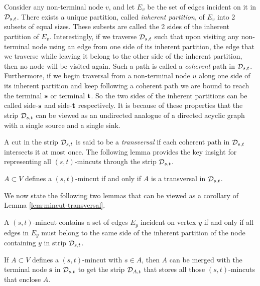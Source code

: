  Consider any non-terminal node $v$, and let $E_v$ be the set of edges incident on it in ${\cal D}_{s,t}$. There exists a unique partition, called {\em inherent partition}, of $E_v$ into 2 subsets of equal sizes. These subsets are called the 2 sides of the inherent partition of $E_v$. 
 Interestingly, if we traverse ${\cal D}_{s,t}$ such that upon visiting any non-terminal node using an edge from one side of its inherent partition, the edge that we traverse while leaving it belong to the other side of the inherent partition, then no node will be visited again. Such a path is called a {\em coherent} path in ${\cal D}_{s,t}$. Furthermore, if we begin traversal from a non-terminal node $u$ along one side of its inherent partition and keep following a coherent path we are bound to reach the terminal ${\bf s}$ or terminal ${\bf t}$. So the two sides of the inherent partitions can be called side-${\bf s}$
 and side-${\bf t}$ respectively.
It is because of these properties
that the strip ${\cal D}_{s,t}$ can be viewed as an undirected analogue of a directed acyclic graph with a single source and a single sink. 

A cut in the strip ${\cal D}_{s,t}$ is said to be a \textit{transversal} if each coherent path in ${\cal D}_{s,t}$ intersects it at most once. The following lemma provides the key insight for representing all $(s,t)$-mincuts through the strip ${\cal D}_{s,t}$.
\begin{lemma}
    $A\subset V$ defines a $(s,t)$-mincut if and only if $A$ is a transversal in ${\cal D}_{s,t}$.
    \label{lem:mincut-transversal}
\end{lemma}

We now state the following two lemmas that can be viewed as a corollary of Lemma \ref{lem:mincut-transversal}.

\begin{lemma}
A $(s,t)$-mincut contains a set of edges $E_y$ incident on vertex $y$ if and only if all edges in $E_y$ must belong to the same side of the inherent partition of the node containing $y$ in strip ${\cal D}_{s,t}$.
\label{lem:E_y-edges-same-side}
\end{lemma}

\begin{lemma} 
If $A\subset V$ defines a $(s,t)$-mincut with $s\in A$, then $A$ can be merged with the terminal node ${\mathbf s}$ in ${\cal D}_{s,t}$ to get the strip ${\cal D}_{A,t}$ that stores all those $(s,t)$-mincuts that enclose $A$.
\label{lem:strip-A}
\end{lemma}

